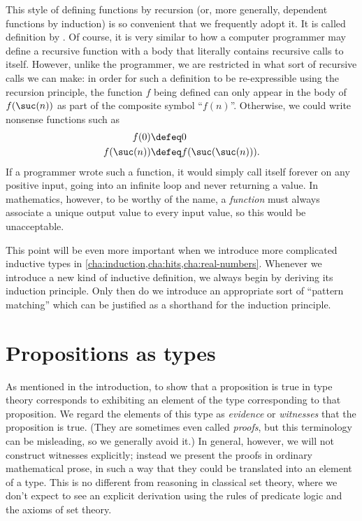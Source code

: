 This style of defining functions by recursion (or, more generally, dependent functions by induction) is so convenient that we frequently adopt it.
It is called definition by .
Of course, it is very similar to how a computer programmer may define a recursive function with a body that literally contains recursive calls to itself.
However, unlike the programmer, we are restricted in what sort of recursive calls we can make: in order for such a definition to be re-expressible using the recursion principle, the function $f$ being defined can only appear in the body of $f(\suc(n))$ as part of the composite symbol ``$f(n)$''.
Otherwise, we could write nonsense functions such as
\begin{align*}
  f(0)&\defeq 0\\
  f(\suc(n)) &\defeq f(\suc(\suc(n))).
\end{align*}
If a programmer wrote such a function, it would simply call itself forever on any positive input, going into an infinite loop and never returning a value.
In mathematics, however, to be worthy of the name, a \emph{function} must always associate a unique output value to every input value, so this would be unacceptable.

This point will be even more important when we introduce more complicated inductive types in \cref{cha:induction,cha:hits,cha:real-numbers}.
Whenever we introduce a new kind of inductive definition, we always begin by deriving its induction principle.
Only then do we introduce an appropriate sort of ``pattern matching'' which can be justified as a shorthand for the induction principle.

%
%

\section{Propositions as types}
\label{sec:pat}

%
%
As mentioned in the introduction, to show that a proposition is true in type theory corresponds to exhibiting an element of the type corresponding to that proposition.
%
%
We regard the elements of this type as \emph{evidence} or \emph{witnesses} that the proposition is true. (They are sometimes even called \emph{proofs}, but this terminology can be misleading, so we generally avoid it.)
In general, however, we will not construct witnesses explicitly; instead we present the proofs in ordinary mathematical prose, in such a way that they could be translated into an element of a type.
This is no different from reasoning in classical set theory, where we don't expect to see an explicit derivation using the rules of predicate logic and the axioms of set theory.

